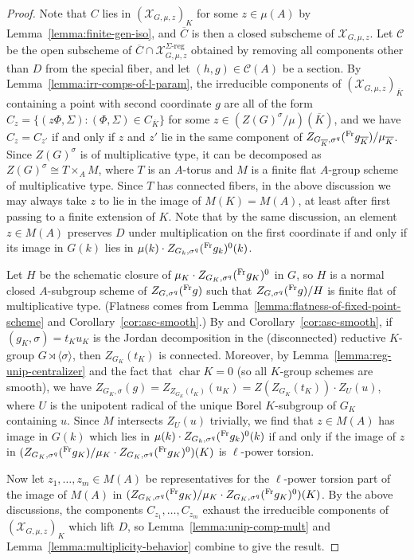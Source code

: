 \documentclass[11pt,reqno]{amsart}
\theoremstyle{definition}
\renewcommand{\rm}{\mathrm}
\newcommand{\sC}{{\mathscr C}}
\newcommand{\sX}{{\mathscr X}}
\DeclareMathOperator{\chara}{char}
\newcommand{\ov}[1]{\overline{#1}}
\begin{document}
\begin{proof}
	Note that $C$ lies in $(\sX_{G,\mu,z})_K$ for some $z \in \mu(A)$ by Lemma~\ref{lemma:finite-gen-iso}, and $\ov{C}$ is then a closed subscheme of $\sX_{G,\mu,z}$. Let $\sC$ be the open subscheme of $\ov{C} \cap \sX_{G,\mu,z}^{\Sigma\textrm{-reg}}$ obtained by removing all components other than $D$ from the special fiber, and let $(h, g) \in \sC(A)$ be a section. By Lemma~\ref{lemma:irr-comps-of-l-param}, the irreducible components of $(\sX_{G,\mu,z})_{\ov{K}}$ containing a point with second coordinate $g$ are all of the form $C_z = \{(z\Phi, \Sigma)\colon (\Phi, \Sigma) \in C_{\ov{K}}\}$ for some $z \in (Z(G)^\sigma/\mu)(\ov{K})$, and we have $C_z = C_{z'}$ if and only if $z$ and $z'$ lie in the same component of $Z_{G_{\ov{K}}, \sigma^q}(\prescript{\rm{Fr}}{}{g_{\ov{K}}})/\mu_{\ov{K}}$. Since $Z(G)^\sigma$ is of multiplicative type, it can be decomposed as $Z(G)^\sigma \cong T \times_A M$, where $T$ is an $A$-torus and $M$ is a finite flat $A$-group scheme of multiplicative type. Since $T$ has connected fibers, in the above discussion we may always take $z$ to lie in the image of $M(K) = M(A)$, at least after first passing to a finite extension of $K$. Note that by the same discussion, an element $z \in M(A)$ preserves $D$ under multiplication on the first coordinate if and only if its image in $G(k)$ lies in $\mu(k) \cdot Z_{G_k, \sigma^q}(\prescript{\rm{Fr}}{}{g_k})^0(k)$.
	
	Let $H$ be the schematic closure of $\mu_K \cdot Z_{G_K,\sigma^q}(\prescript{\rm{Fr}}{}{g_K})^0$ in $G$, so $H$ is a normal closed $A$-subgroup scheme of $Z_{G,\sigma^q}(\prescript{\rm{Fr}}{}{g})$ such that $Z_{G,\sigma^q}(\prescript{\rm{Fr}}{}{g})/H$ is finite flat of multiplicative type. (Flatness comes from Lemma~\ref{lemma:flatness-of-fixed-point-scheme} and Corollary~\ref{cor:asc-smooth}.) By \cite[Theorem 8.1]{SteinbergEndomorphisms} and Corollary~\ref{cor:asc-smooth}, if $(g_K, \sigma) = t_Ku_K$ is the Jordan decomposition in the (disconnected) reductive $K$-group $G \rtimes \langle \sigma \rangle$, then $Z_{G_K}(t_K)$ is connected. Moreover, by Lemma~\ref{lemma:reg-unip-centralizer} and the fact that $\chara K = 0$ (so all $K$-group schemes are smooth), we have $Z_{G_K,\sigma}(g) = Z_{Z_{G_K}(t_K)}(u_K) = Z(Z_{G_K}(t_K)) \cdot Z_U(u)$, where $U$ is the unipotent radical of the unique Borel $K$-subgroup of $G_K$ containing $u$. Since $M$ intersects $Z_U(u)$ trivially, we find that $z \in M(A)$ has image in $G(k)$ which lies in $\mu(k) \cdot Z_{G_k, \sigma^q}(\prescript{\rm{Fr}}{}{g_k})^0(k)$ if and only if the image of $z$ in $(Z_{G_K,\sigma^q}(\prescript{\rm{Fr}}{}{g_K})/\mu_K \cdot Z_{G_K,\sigma^q}(\prescript{\rm{Fr}}{}{g_K})^0)(K)$ is $\ell$-power torsion.
	
	Now let $z_1, \dots, z_m \in M(A)$ be representatives for the $\ell$-power torsion part of the image of $M(A)$ in $(Z_{G_K,\sigma^q}(\prescript{\rm{Fr}}{}{g_K})/\mu_K \cdot Z_{G_K,\sigma^q}(\prescript{\rm{Fr}}{}{g_K})^0)(K)$. By the above discussions, the components $C_{z_1}, \dots, C_{z_m}$ exhaust the irreducible components of $(\sX_{G,\mu,z})_K$ which lift $D$, so Lemma~\ref{lemma:unip-comp-mult} and Lemma~\ref{lemma:multiplicity-behavior} combine to give the result.
\end{proof}
\end{document}
